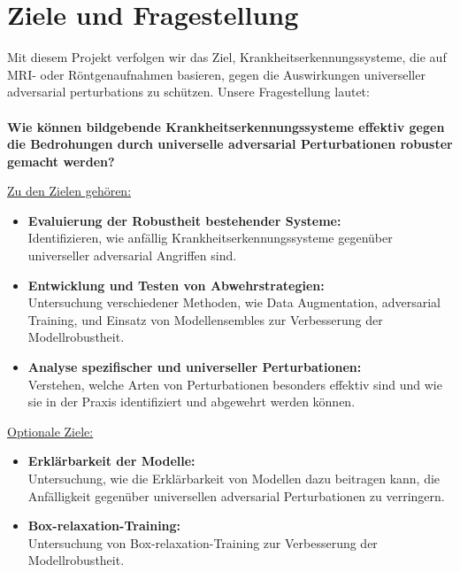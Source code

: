\section{Ziele und Fragestellung}

Mit diesem Projekt verfolgen wir das Ziel, Krankheitserkennungssysteme, die auf MRI- oder Röntgenaufnahmen basieren, gegen die Auswirkungen universeller adversarial perturbations zu schützen. Unsere Fragestellung lautet: \\\\ 
\textbf{Wie können bildgebende Krankheitserkennungssysteme effektiv gegen die Bedrohungen durch universelle adversarial Perturbationen robuster gemacht werden?}

\underline{Zu den Zielen gehören:}

\begin{itemize}
  \item \textbf{Evaluierung der Robustheit bestehender Systeme:} \\Identifizieren, wie anfällig Krankheitserkennungssysteme gegenüber universeller adversarial Angriffen sind.
  \item \textbf{Entwicklung und Testen von Abwehrstrategien:} 
  \\Untersuchung verschiedener Methoden, wie Data Augmentation, adversarial Training, und Einsatz von Modellensembles zur Verbesserung der Modellrobustheit.
  \item \textbf{Analyse spezifischer und universeller Perturbationen:} \\Verstehen, welche Arten von Perturbationen besonders effektiv sind und wie sie in der Praxis identifiziert und abgewehrt werden können.
\end{itemize}


\underline{Optionale Ziele:} 
\begin{itemize}
\item \textbf{Erklärbarkeit der Modelle:} \\Untersuchung, wie die Erklärbarkeit von Modellen dazu beitragen kann, die Anfälligkeit gegenüber universellen adversarial Perturbationen zu verringern.
\item \textbf{Box-relaxation-Training:} \\
Untersuchung von Box-relaxation-Training zur Verbesserung der Modellrobustheit.
\end{itemize}